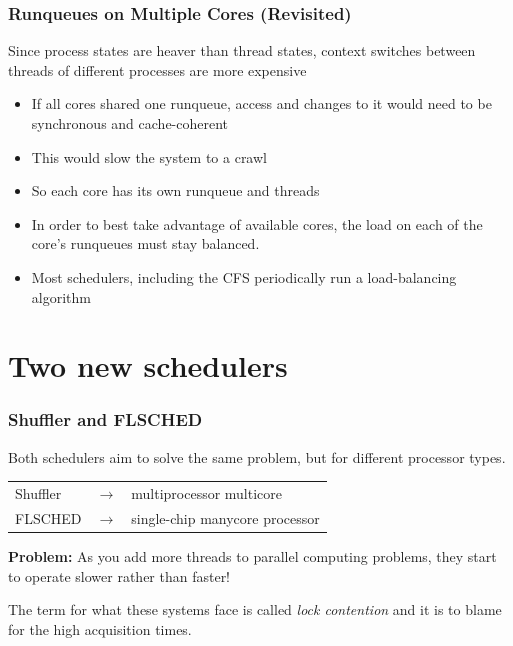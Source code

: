 \documentclass{beamer}
\newcommand{\linespace}{\vskip 0.25cm}
\begin{document}
\begin{frame}
\frametitle{Runqueues on Multiple Cores (Revisited)}

Since process states are heaver than thread states, context switches between threads of different processes are more expensive

\linespace

\begin{itemize}
	\item If all cores shared one runqueue, access and changes to it would need to be synchronous and cache-coherent
	\item This would slow the system to a crawl
	\item So each core has its own runqueue and threads
\end{itemize}

\linespace

\begin{itemize}
\item In order to best take advantage of available cores, the load on each of the core's runqueues must stay balanced.
\item Most schedulers, including the CFS periodically run a load-balancing algorithm
\end{itemize}
\end{frame}

\section[New Schedulers]{Two new schedulers}


\begin{frame}

\frametitle{Shuffler and FLSCHED}

\linespace

Both schedulers aim to solve the same problem, but for different processor types.

\linespace

\begin{table}

\begin{tabular}{l c l}
Shuffler & $\rightarrow$ & multiprocessor multicore \\
FLSCHED & $\rightarrow$ & single-chip manycore processor\\
\end{tabular}

\end{table}

\linespace
\textbf{Problem:} As you add more threads to parallel computing problems, they start to operate slower rather than faster!

\linespace

The term for what these systems face is called \emph{lock contention} and it is to blame for the high acquisition times.

\end{frame}
\end{document}
